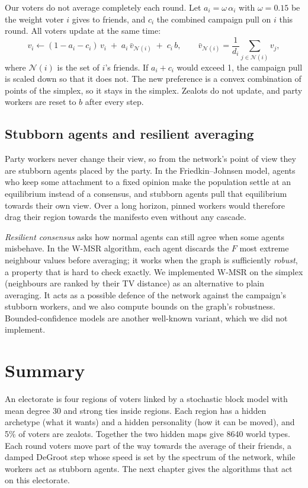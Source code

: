 \documentclass[11pt,a4paper,oneside]{report}
\newcommand{\summarysection}{\section{Summary}}
\begin{document}
Our voters do not average completely each round. Let $a_i = \omega\,\alpha_i$ with $\omega = 0.15$ be the
weight voter $i$ gives to friends, and $c_i$ the combined campaign pull on $i$ this round. All voters
update at the same time:
\begin{equation}\label{eq:update}
  v_i \leftarrow (1 - a_i - c_i)\,v_i \;+\; a_i\,\bar v_{\mathcal N(i)} \;+\; c_i\, b,
  \qquad
  \bar v_{\mathcal N(i)} = \frac{1}{d_i}\sum_{j \in \mathcal N(i)} v_j ,
\end{equation}
where $\mathcal N(i)$ is the set of $i$'s friends. If $a_i + c_i$ would exceed 1, the campaign pull is
scaled down so that it does not. The new preference is a convex combination of points of the simplex, so
it stays in the simplex. Zealots do not update, and party workers are reset to $b$ after every step.

\subsection{Stubborn agents and resilient averaging}

Party workers never change their view, so from the network's point of view they are stubborn agents placed
by the party. In the Friedkin--Johnsen model, agents who keep some attachment to a
fixed opinion make the population settle at an equilibrium instead of a consensus, and stubborn agents
pull that equilibrium towards their own view. Over a long horizon, pinned workers would therefore drag
their region towards the manifesto even without any cascade.

\emph{Resilient consensus} asks how normal agents can still agree when some agents misbehave. In the W-MSR
algorithm, each agent discards the $F$ most extreme neighbour values before averaging;
it works when the graph is sufficiently \emph{robust}, a property that is hard to check exactly. We
implemented W-MSR on the simplex (neighbours are ranked by their TV distance) as an alternative to plain
averaging. It acts as a possible defence of the network against the campaign's stubborn workers, and we
also compute bounds on the graph's robustness. Bounded-confidence models are another
well-known variant, which we did not implement.

\summarysection

An electorate is four regions of voters linked by a stochastic block model with mean degree 30 and strong
ties inside regions. Each region has a hidden archetype (what it wants) and a hidden personality (how it
can be moved), and 5\% of voters are zealots. Together the two hidden maps give 8640 world types. Each
round voters move part of the way towards the average of their friends, a damped DeGroot step whose speed
is set by the spectrum of the network, while workers act as stubborn agents. The next chapter gives the
algorithms that act on this electorate.
\end{document}
